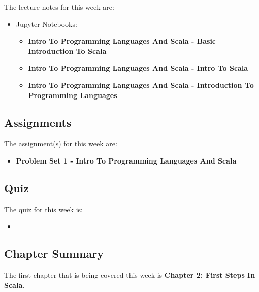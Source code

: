 \noindent The lecture notes for this week are:

\begin{itemize}
    \item Jupyter Notebooks:
    \begin{itemize}
        \item \textbf{Intro To Programming Languages And Scala - Basic Introduction To Scala}
        \item \textbf{Intro To Programming Languages And Scala - Intro To Scala}
        \item \textbf{Intro To Programming Languages And Scala - Introduction To Programming Languages}
    \end{itemize}
\end{itemize}

\subsection{Assignments}

The assignment(s) for this week are:

\begin{itemize}
    \item \textbf{Problem Set 1 - Intro To Programming Languages And Scala}
\end{itemize}

\subsection{Quiz}

The quiz for this week is:

\begin{itemize}
    \item {}
\end{itemize}

\subsection{Chapter Summary}

The first chapter that is being covered this week is \textbf{Chapter 2: First Steps In Scala}.

